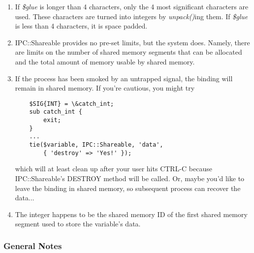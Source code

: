 \begin{enumerate}

\item
If {\em \$glue\/} is longer than 4 characters, only the 4 most significant
characters are used.  These characters are turned into integers by {\em unpack()\/}ing
them.  If {\em \$glue\/} is less than 4 characters, it is space padded.

\item
IPC::Shareable provides no pre-set limits, but the system does.
Namely, there are limits on the number of shared memory segments that
can be allocated and the total amount of memory usable by shared
memory.

\item
If the process has been smoked by an untrapped signal, the binding
will remain in shared memory.  If you're cautious, you might try
\begin{verbatim}
    $SIG{INT} = \&catch_int;
    sub catch_int {
        exit;
    }
    ...
    tie($variable, IPC::Shareable, 'data',
        { 'destroy' => 'Yes!' });
\end{verbatim}

which will at least clean up after your user hits CTRL-C because
IPC::Shareable's DESTROY method will be called.  Or, maybe you'd like
to leave the binding in shared memory, so subsequent process can
recover the data...

\item
The integer happens to be the shared memory ID of the first shared
memory segment used to store the variable's data.

\end{enumerate}

\subsubsection*{General Notes}%


